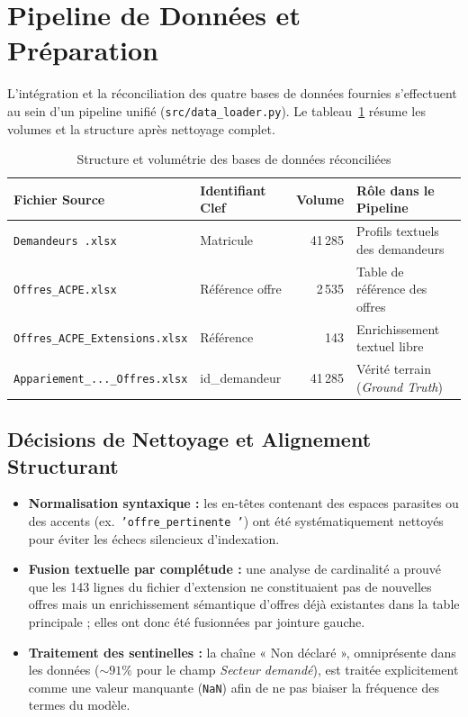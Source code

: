 \documentclass[11pt,a4paper]{article}
\begin{document}
\section{Pipeline de Données et Préparation}
L'intégration et la réconciliation des quatre bases de données fournies s'effectuent au sein
d'un pipeline unifié (\texttt{src/data\_loader.py}). Le tableau~\ref{tab:donnees} résume les
volumes et la structure après nettoyage complet.

\begin{table}[h]
\centering
\caption{Structure et volumétrie des bases de données réconciliées}
\label{tab:donnees}
\small
\begin{tabular}{@{}llrl@{}}
\toprule
\textbf{Fichier Source} & \textbf{Identifiant Clef} & \textbf{Volume} & \textbf{Rôle dans le Pipeline} \\
\midrule
\texttt{Demandeurs .xlsx}                 & Matricule       & 41\,285 & Profils textuels des demandeurs \\
\texttt{Offres\_ACPE.xlsx}                & Référence offre & 2\,535  & Table de référence des offres \\
\texttt{Offres\_ACPE\_Extensions.xlsx}    & Référence       & 143     & Enrichissement textuel libre \\
\texttt{Appariement\_...\_Offres.xlsx}    & id\_demandeur   & 41\,285 & Vérité terrain (\emph{Ground Truth}) \\
\bottomrule
\end{tabular}
\end{table}

\subsection{Décisions de Nettoyage et Alignement Structurant}
\begin{itemize}
  \item \textbf{Normalisation syntaxique :} les en-têtes contenant des espaces parasites ou des
  accents (ex.\ \texttt{'offre\_pertinente~'}) ont été systématiquement nettoyés pour éviter les
  échecs silencieux d'indexation.
  \item \textbf{Fusion textuelle par complétude :} une analyse de cardinalité a prouvé que les
  143 lignes du fichier d'extension ne constituaient pas de nouvelles offres mais un
  enrichissement sémantique d'offres déjà existantes dans la table principale ; elles ont donc
  été fusionnées par jointure gauche.
  \item \textbf{Traitement des sentinelles :} la chaîne « Non déclaré », omniprésente dans les
  données ($\sim 91\%$ pour le champ \emph{Secteur demandé}), est traitée explicitement comme une
  valeur manquante (\texttt{NaN}) afin de ne pas biaiser la fréquence des termes du modèle.
\end{itemize}
\end{document}
